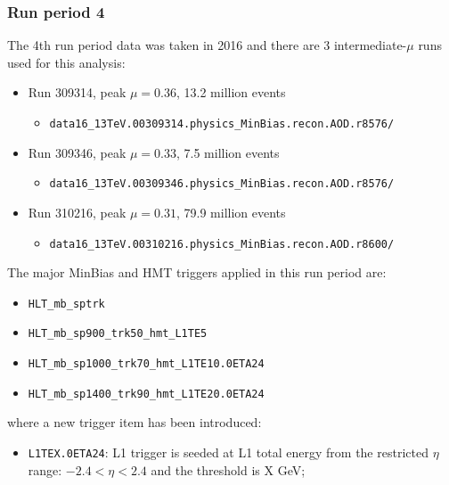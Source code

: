 \subsubsection{Run period 4}
The 4th run period data was taken in 2016 and there are 3 intermediate-$\mu$ runs used for this analysis:
\begin{itemize}

\item Run 309314, peak $\mu=0.36$, 13.2 million events
\begin{itemize}[leftmargin=*]
\item[] \verb|data16_13TeV.00309314.physics_MinBias.recon.AOD.r8576/|
\end{itemize}

\item Run 309346, peak $\mu=0.33$, 7.5 million events
\begin{itemize}[leftmargin=*]
\item[] \verb|data16_13TeV.00309346.physics_MinBias.recon.AOD.r8576/|
\end{itemize}

\item Run 310216, peak $\mu=0.31$, 79.9 million events
\begin{itemize}[leftmargin=*]
\item[] \verb|data16_13TeV.00310216.physics_MinBias.recon.AOD.r8600/|
\end{itemize}

\end{itemize}
The major MinBias and HMT triggers applied in this run period are:
\begin{itemize}
\item \verb|HLT_mb_sptrk|
\item \verb|HLT_mb_sp900_trk50_hmt_L1TE5|
\item \verb|HLT_mb_sp1000_trk70_hmt_L1TE10.0ETA24|
\item \verb|HLT_mb_sp1400_trk90_hmt_L1TE20.0ETA24|
\end{itemize}
where a new trigger item has been introduced:
\begin{itemize}
\item \verb|L1TEX.0ETA24|: L1 trigger is seeded at L1 total energy from the restricted $\eta$ range: $-2.4<\eta<2.4$ and the threshold is X GeV;
\end{itemize}

